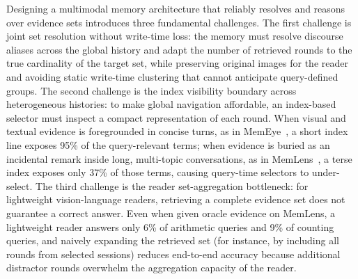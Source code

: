 \documentclass[10pt]{article}
\begin{document}
Designing a multimodal memory architecture that reliably resolves and reasons over evidence sets introduces three fundamental challenges. The first challenge is joint set resolution without write-time loss: the memory must resolve discourse aliases across the global history and adapt the number of retrieved rounds to the true cardinality of the target set, while preserving original images for the reader and avoiding static write-time clustering that cannot anticipate query-defined groups. The second challenge is the index visibility boundary across heterogeneous histories: to make global navigation affordable, an index-based selector must inspect a compact representation of each round. When visual and textual evidence is foregrounded in concise turns, as in MemEye~\citep{guo2026memeye}, a short index line exposes 95\% of the query-relevant terms; when evidence is buried as an incidental remark inside long, multi-topic conversations, as in MemLens~\citep{ren2026memlens}, a terse index exposes only 37\% of those terms, causing query-time selectors to under-select. The third challenge is the reader set-aggregation bottleneck: for lightweight vision-language readers, retrieving a complete evidence set does not guarantee a correct answer. Even when given oracle evidence on MemLens, a lightweight reader answers only 6\% of arithmetic queries and 9\% of counting queries, and naively expanding the retrieved set (for instance, by including all rounds from selected sessions) reduces end-to-end accuracy because additional distractor rounds overwhelm the aggregation capacity of the reader.
\end{document}
